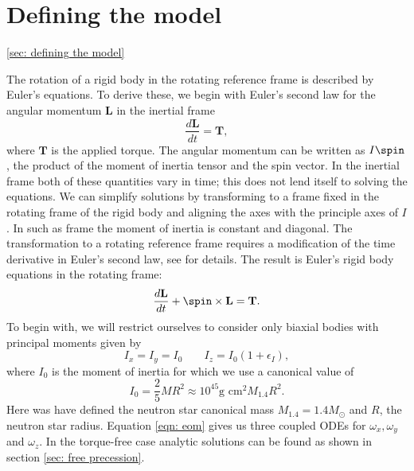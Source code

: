 \documentclass[/home/greg/Thesis/main/main.tex]{subfiles}
\begin{document}
\section{Defining the model}
\ref{sec: defining the model}

The rotation of a rigid body in the rotating reference frame is described by
Euler's equations. To derive these, we begin with Euler's second law  for the
angular momentum $\mathbf{L}$ in the inertial frame
\begin{equation}
    \frac{d\mathbf{L}}{dt}=\mathbf{T},
\end{equation}
where $\mathbf{T}$ is the applied torque. The angular momentum can be written
as $I \spin$, the product of the moment of inertia tensor and the spin vector.
In the inertial frame both of these quantities vary in time; this does not lend
itself to solving the equations. We can simplify solutions by transforming to a
frame fixed in the rotating frame of the rigid body and aligning the axes with
the principle axes of $I$. In such as frame the moment of inertia is constant
and diagonal. The transformation to a rotating reference frame requires a
modification of the time derivative in Euler's second law, see \citet{Landau1969}
for details. The result is Euler's rigid body equations in the rotating frame:
\begin{equation}
    \frac{d\mathbf{L}}{dt} + \spin \times \mathbf{L} = \mathbf{T}.
    \label{eqn: eom}
\end{equation}
To begin with, we will restrict ourselves to consider only biaxial bodies with 
principal moments given by
\begin{equation}
I_{x} = I_{y} = I_{0} \;\;\;\;\;\;\; I_{z} = I_{0}(1+\epsilon_{I}),
\end{equation}
where $I_{0}$ is the moment of inertia for which we use a canonical value of 
\begin{equation}
I_{0} = \frac{2}{5}MR^{2} \approx 10^{45}\textrm{g cm}^{2} M_{1.4}R^{2}.
\end{equation}
Here was have defined the neutron star canonical mass $M_{1.4} = 1.4 M_{\odot}$ 
and $R$, the neutron star radius.
Equation \ref{eqn: eom} gives us three coupled ODEs for $\omega_{x}, 
\omega_{y}$ and $\omega_{z}$. In the torque-free case analytic solutions can be
found as shown in section \ref{sec: free precession}.
\end{document}
